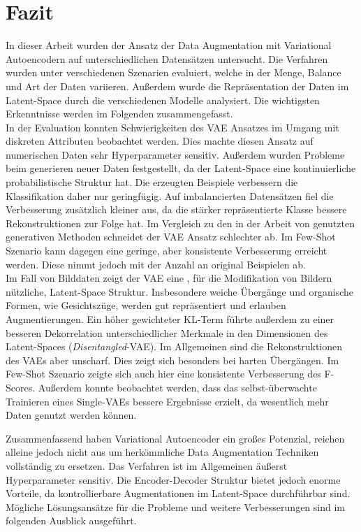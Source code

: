 \chapter{Fazit}
In dieser Arbeit wurden der Ansatz der Data Augmentation mit Variational Autoencodern auf unterschiedlichen Datensätzen untersucht. Die Verfahren wurden unter verschiedenen Szenarien evaluiert, welche in der Menge, Balance und Art der Daten variieren. Außerdem wurde die Repräsentation der Daten im Latent-Space durch die verschiedenen Modelle analysiert. Die wichtigsten Erkenntnisse werden im Folgenden zusammengefasst. \\

In der Evaluation konnten Schwierigkeiten des VAE Ansatzes im Umgang mit diskreten Attributen beobachtet werden. Dies machte diesen Ansatz auf numerischen Daten sehr Hyperparameter sensitiv. Außerdem wurden Probleme beim generieren neuer Daten festgestellt, da der Latent-Space eine kontinuierliche probabilistische Struktur hat. Die erzeugten Beispiele verbessern die Klassifikation daher nur geringfügig. Auf imbalancierten Datensätzen fiel die Verbesserung zusätzlich kleiner aus, da die stärker repräsentierte Klasse bessere Rekonstruktionen zur Folge hat. Im Vergleich zu den in der Arbeit von \cite{Moreno-Barea2020} genutzten generativen Methoden schneidet der VAE Ansatz schlechter ab. Im Few-Shot Szenario kann dagegen eine geringe, aber konsistente Verbesserung erreicht werden. Diese nimmt jedoch mit der Anzahl an original Beispielen ab.\\

Im Fall von Bilddaten zeigt der VAE eine , für die Modifikation von Bildern nützliche, Latent-Space Struktur. Insbesondere weiche Übergänge und organische Formen, wie Gesichtszüge, werden gut repräsentiert und erlauben Augmentierungen. Ein höher gewichteter KL-Term führte außerdem zu einer besseren Dekorrelation unterschiedlicher Merkmale in den Dimensionen des Latent-Spaces (\textit{Disentangled}-VAE). Im Allgemeinen sind die Rekonstruktionen des VAEs aber unscharf. Dies zeigt sich besonders bei harten Übergängen. 
Im Few-Shot Szenario zeigte sich auch hier eine konsistente Verbesserung des F-Scores. Außerdem konnte beobachtet werden, dass das selbst-überwachte Trainieren eines Single-VAEs bessere Ergebnisse erzielt, da wesentlich mehr Daten genutzt werden können.

\pagebreak

Zusammenfassend haben Variational Autoencoder ein großes Potenzial, reichen alleine jedoch nicht aus um herkömmliche Data Augmentation Techniken vollständig zu ersetzen. Das Verfahren ist im Allgemeinen äußerst Hyperparameter sensitiv. Die Encoder-Decoder Struktur bietet jedoch enorme Vorteile, da kontrollierbare Augmentationen im Latent-Space durchführbar sind. Mögliche Lösungsansätze für die Probleme und weitere Verbesserungen sind im folgenden Ausblick ausgeführt.
